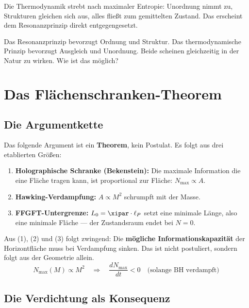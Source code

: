 Die Thermodynamik strebt nach maximaler Entropie: Unordnung nimmt zu, Strukturen gleichen sich aus, alles fließt zum gemittelten Zustand. Das erscheint dem Resonanzprinzip direkt entgegengesetzt.

\begin{wichtig}
Das Resonanzprinzip bevorzugt Ordnung und Struktur. Das thermodynamische Prinzip bevorzugt Ausgleich und Unordnung. Beide scheinen gleichzeitig in der Natur zu wirken. Wie ist das möglich?
\end{wichtig}

\section{Das Flächen\-schranken-Theorem}

\subsection{Die Argumentkette}

Das folgende Argument ist ein \textbf{Theorem}, kein Postulat. Es folgt aus drei etablierten Größen:

\begin{enumerate}
  \item \textbf{Holographische Schranke (Bekenstein):} Die maximale Information die eine Fläche tragen kann, ist proportional zur Fläche: $N_\text{max} \propto A$.
  \item \textbf{Hawking-Verdampfung:} $A \propto M^2$ schrumpft mit der Masse.
  \item \textbf{FFGFT-Untergrenze:} $L_0 = \xipar \cdot \ell_P$ setzt eine minimale Länge, also eine minimale Fläche --- der Zustandsraum endet bei $N = 0$.
\end{enumerate}

\begin{keyresult}
Aus (1), (2) und (3) folgt zwingend: Die \textbf{mögliche Informationskapazität} der Horizontfläche muss bei Verdampfung sinken. Das ist nicht postuliert, sondern folgt aus der Geometrie allein.
\begin{equation}
  N_\text{max}(M) \propto M^2 \quad \Rightarrow \quad \frac{dN_\text{max}}{dt} < 0 \quad \text{(solange BH verdampft)}
\end{equation}
\end{keyresult}

\subsection{Die Verdichtung als Konsequenz}

